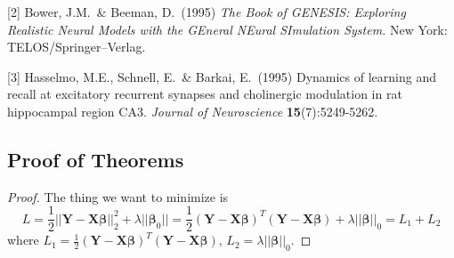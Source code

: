 \documentclass{article}
\newtheorem{proof}{Proof}
\begin{document}
[2] Bower, J.M.\ \& Beeman, D.\ (1995) {\it The Book of GENESIS: Exploring
  Realistic Neural Models with the GEneral NEural SImulation System.}  New York:
TELOS/Springer--Verlag.

[3] Hasselmo, M.E., Schnell, E.\ \& Barkai, E.\ (1995) Dynamics of learning and
recall at excitatory recurrent synapses and cholinergic modulation in rat
hippocampal region CA3. {\it Journal of Neuroscience} {\bf 15}(7):5249-5262.

\begin{appendices}
	\section{Proof of Theorems}
	\begin{proof}
		The thing we want to minimize is
		\begin{equation*}
		L=\frac{1}{2}||\mathbf{Y-X}\bm{\beta}||^2_2+\lambda||\bm{\beta}_0||=\frac{1}{2}(\mathbf{Y-X}\bm{\beta})^T(\mathbf{Y-X}\bm{\beta})+\lambda ||\bm{\beta}||_0=L_1+L_2
		\end{equation*} 
		where $L_1=\frac{1}{2}(\mathbf{Y-X}\bm{\beta})^T(\mathbf{Y-X}\bm{\beta})$, $L_2=\lambda ||\bm{\beta}||_0$. 
	

\end{proof}
\end{appendices}
\end{document}
